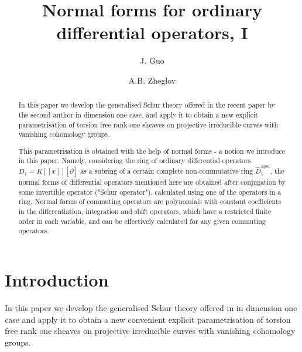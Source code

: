 \documentclass[11pt]{article}
\theoremstyle{definition}
\theoremstyle{plain}
\numberwithin{equation}{section}
\begin{document}
 
\title{Normal forms for ordinary differential operators, I}
\author{J. Guo \and  A.B. Zheglov}
\date{}
\maketitle




\begin{abstract}
In this paper we develop the generalised Schur theory offered in the recent paper by the second author in  dimension one case, and apply it to obtain  a new explicit parametrisation of torsion free rank one sheaves on projective irreducible curves with vanishing cohomology groups.

This parametrisation is obtained with the help of normal forms - a notion we introduce in this paper. Namely, considering the ring of ordinary differential operators $D_1=K[[x]][\partial ]$ as a subring of a certain complete non-commutative ring $\hat{D}_1^{sym}$, the normal forms of differential operators mentioned here are obtained after conjugation by some invertible operator ("Schur operator"), calculated using one of the operators in a ring. Normal forms of commuting operators are polynomials with constant coefficients in the differentiation, integration and shift operators, which have a restricted finite order in each variable, and can be effectively calculated for any given commuting operators. 

\end{abstract}



\tableofcontents


\section{Introduction}
\label{S:introduction}

In this paper we develop the generalised Schur theory offered in \cite{A.Z} in  dimension one case and apply it to obtain  a new convenient explicit parametrisation of torsion free rank one sheaves on projective irreducible curves with vanishing cohomology groups. 
\end{document}
